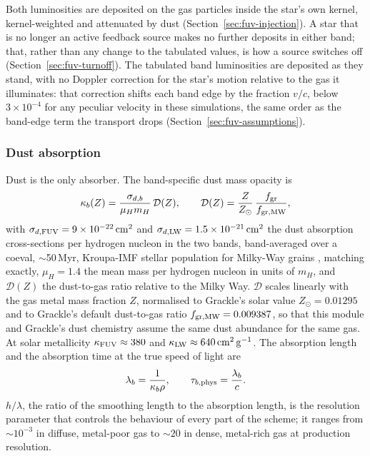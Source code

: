 Both luminosities are deposited on the gas particles inside the star's own
kernel, kernel-weighted and attenuated by dust
(Section~\ref{sec:fuv-injection}). A star that is no longer an active
feedback source makes no further deposits in either band; that, rather than
any change to the tabulated values, is how a source switches off
(Section~\ref{sec:fuv-turnoff}). The tabulated band luminosities are
deposited as they stand, with no Doppler correction for the star's motion
relative to the gas it illuminates: that correction shifts each band edge
by the fraction $v/c$, below $3\times10^{-4}$ for any peculiar velocity in
these simulations, the same order as the band-edge term the transport drops
(Section~\ref{sec:fuv-assumptions}).

\subsubsection{Dust absorption}
\label{sec:fuv-opacity}

Dust is the only absorber. The band-specific dust mass opacity is
\begin{equation}
  \kappa_b(Z) = \frac{\sigma_{d,b}}{\mu_H m_H}\,\mathcal D(Z), \qquad
  \mathcal D(Z) = \frac{Z}{Z_\odot}\,\frac{f_{\rm gr}}{f_{\rm gr,MW}},
  \label{eq:fuv-kappa}
\end{equation}
with $\sigma_{d,{\rm FUV}} = 9\times10^{-22}\,{\rm cm^2}$ and
$\sigma_{d,{\rm LW}} = 1.5\times10^{-21}\,{\rm cm^2}$ the dust
absorption cross-sections per hydrogen nucleon in the two bands,
band-averaged over a coeval, $\sim$50\,Myr, Kroupa-IMF stellar
population for Milky-Way grains \citep{WeingartnerDraine2001},
matching \citet[their PE and LW bands, Section~2.4]{Kim2023} exactly,
$\mu_H = 1.4$ the mean mass per hydrogen nucleon in units of
$m_H$, and $\mathcal D(Z)$ the dust-to-gas ratio relative to the Milky
Way. $\mathcal D$ scales linearly with the gas metal mass fraction $Z$,
normalised to Grackle's solar value $Z_\odot = 0.01295$ and to Grackle's
default dust-to-gas ratio $f_{\rm gr,MW} = 0.009387$, so that this module
and Grackle's dust chemistry assume the same dust abundance for the same
gas. At solar metallicity $\kappa_{\rm FUV}\approx 380$ and $\kappa_{\rm
LW}\approx 640\,{\rm cm^2\,g^{-1}}$. The absorption length and the
absorption time at the true speed of light are
\begin{equation}
  \lambda_b = \frac{1}{\kappa_b\rho}, \qquad
  \tau_{b,{\rm phys}} = \frac{\lambda_b}{c} .
  \label{eq:fuv-lambda}
\end{equation}
$h/\lambda$, the ratio of the smoothing length to the absorption length,
is the resolution parameter that controls the behaviour of every part of
the scheme; it ranges from $\sim10^{-3}$ in diffuse, metal-poor gas to
$\sim20$ in dense, metal-rich gas at production resolution.

